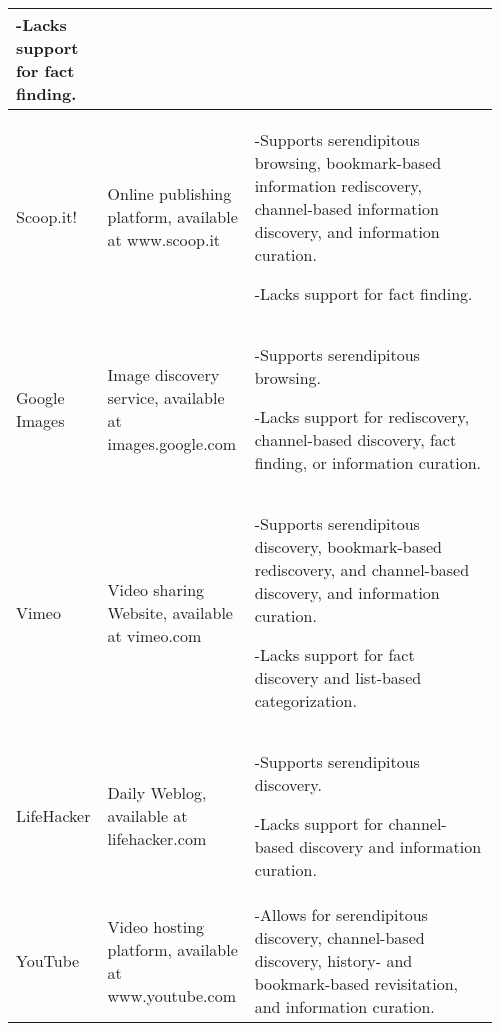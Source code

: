 \begin{longtable}{|p{0.16\linewidth}| p{0.30\linewidth}| p{0.50\linewidth}|}
-\hspace{0.4cm}Lacks support for fact finding.                                                                       \\
\hline
Scoop.it!       & \raggedright Online publishing platform, available at www.scoop.it                        & -\hspace{0.4cm}Supports serendipitous browsing, bookmark-based information rediscovery, channel-based information discovery, and information curation. 

-\hspace{0.4cm}Lacks support for fact finding.                                                 \\
\hline
Google Images   & \raggedright Image discovery service, available at images.google.com                      & -\hspace{0.4cm}Supports serendipitous browsing. 

-\hspace{0.4cm}Lacks support for rediscovery, channel-based discovery, fact finding, or  information curation.                                                                                                         \\
\hline
Vimeo           & \raggedright Video sharing Website, available at vimeo.com                                & -\hspace{0.4cm}Supports serendipitous discovery, bookmark-based rediscovery, and channel-based discovery, and information curation. 

-\hspace{0.4cm}Lacks support for fact discovery and list-based categorization. \\
\hline
LifeHacker      & \raggedright Daily Weblog, available at lifehacker.com                                    & -\hspace{0.4cm}Supports serendipitous discovery. 

-\hspace{0.4cm}Lacks support for channel-based discovery and information curation.                                                                                                                                                                                                 \\
\hline
YouTube         & \raggedright Video hosting platform, available at www.youtube.com                         & -\hspace{0.4cm}Allows for serendipitous discovery, channel-based discovery, history- and bookmark-based revisitation, and information curation. 


\end{longtable}
